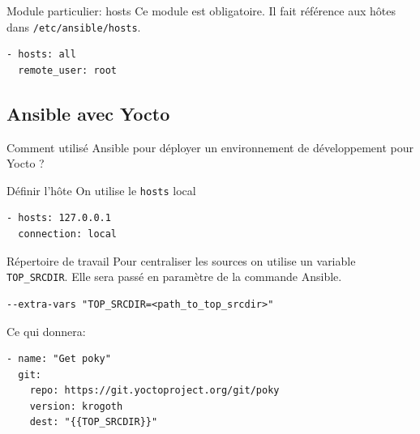 \documentclass[compress]{smilebeamer}
\begin{document}
\begin{frame}[fragile]{Module particulier: hosts}
Ce module est obligatoire.\newline
Il fait référence aux hôtes dans \texttt{/etc/ansible/hosts}.
\begin{lstlisting}[style=bitbake]
- hosts: all
  remote_user: root
\end{lstlisting}
\end{frame}

\subsection{Ansible avec Yocto}

\begin{frame}
\begin{center}
\textcolor{smileOrange}{\huge{Comment utilisé Ansible pour déployer un environnement de développement pour Yocto ?}}
\end{center}
\end{frame}

\begin{frame}[fragile]{Définir l'hôte}
On utilise le \texttt{hosts} local
\begin{lstlisting}[style=bitbake]
- hosts: 127.0.0.1
  connection: local
\end{lstlisting}
\end{frame}

\begin{frame}[fragile]{Répertoire de travail}
Pour centraliser les sources on utilise un variable \texttt{TOP\_SRCDIR}.\newline
Elle sera passé en paramètre de la commande Ansible.
\begin{lstlisting}[style=shell]
--extra-vars "TOP_SRCDIR=<path_to_top_srcdir>"
\end{lstlisting}
Ce qui donnera:
\begin{lstlisting}[style=bitbake]
- name: "Get poky"
  git:
    repo: https://git.yoctoproject.org/git/poky
    version: krogoth
    dest: "{{TOP_SRCDIR}}"
\end{lstlisting}
\end{frame}
\end{document}
